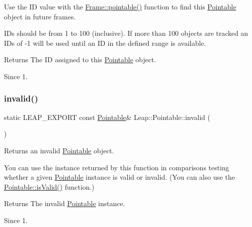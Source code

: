 \begin{DoxyCodeInclude}
\end{DoxyCodeInclude}


Use the ID value with the \hyperlink{class_leap_1_1_frame_aa60a6824c815e54fcab21c549c2f77ac}{Frame\+::pointable()} function to find this \hyperlink{class_leap_1_1_pointable}{Pointable} object in future frames.

I\+Ds should be from 1 to 100 (inclusive). If more than 100 objects are tracked an I\+Ds of -\/1 will be used until an ID in the defined range is available.

\begin{DoxyReturn}{Returns}
The ID assigned to this \hyperlink{class_leap_1_1_pointable}{Pointable} object. 
\end{DoxyReturn}
\begin{DoxySince}{Since}
1. 
\end{DoxySince}
\mbox{\label{class_leap_1_1_pointable_a2d66e938c10bf54778fdfe5abf7dd77d}} 
\subsubsection{\texorpdfstring{invalid()}{invalid()}}
{\footnotesize\ttfamily static L\+E\+A\+P\+\_\+\+E\+X\+P\+O\+RT const \hyperlink{class_leap_1_1_pointable}{Pointable}\& Leap\+::\+Pointable\+::invalid (\begin{DoxyParamCaption}{ }\end{DoxyParamCaption})\hspace{0.3cm}{\ttfamily [static]}}

Returns an invalid \hyperlink{class_leap_1_1_pointable}{Pointable} object.

You can use the instance returned by this function in comparisons testing whether a given \hyperlink{class_leap_1_1_pointable}{Pointable} instance is valid or invalid. (You can also use the \hyperlink{class_leap_1_1_pointable_afe50d02eb1b4f554a4089c329fda1a45}{Pointable\+::is\+Valid()} function.)


\begin{DoxyCodeInclude}
\end{DoxyCodeInclude}


\begin{DoxyReturn}{Returns}
The invalid \hyperlink{class_leap_1_1_pointable}{Pointable} instance. 
\end{DoxyReturn}
\begin{DoxySince}{Since}
1. 
\end{DoxySince}
\mbox{\label{class_leap_1_1_pointable_aa59171cfd2c364bc9edc95e51ec1ffc1}} 
